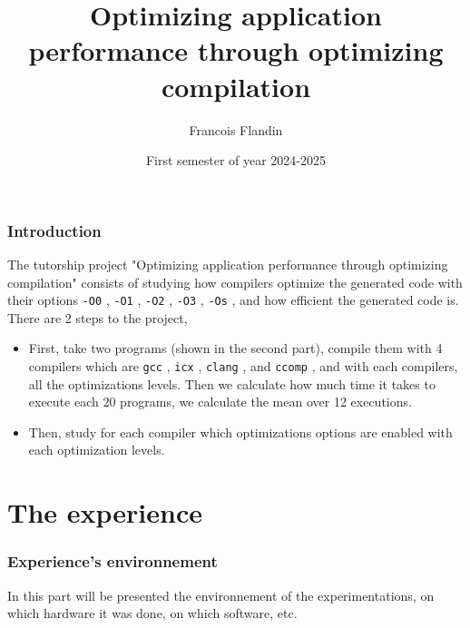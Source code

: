 \documentclass{rapport}
\title{Optimizing application performance through optimizing compilation}
\author{Francois Flandin}
\date{First semester of year 2024-2025}
\newcommand{\gcc}{\texttt{gcc} }
\newcommand{\icx}{\texttt{icx} }
\newcommand{\clang}{\texttt{clang} }
\newcommand{\comp}{\texttt{ccomp} }
\newcommand{\optizero}{\texttt{-O0} }
\newcommand{\optione}{\texttt{-O1} }
\newcommand{\optitwo}{\texttt{-O2} }
\newcommand{\optithree}{\texttt{-O3} }
\newcommand{\optisize}{\texttt{-Os} }
\begin{document}
\maketitle

\begin{abstract}

\end{abstract}

\clearpage
\tableofcontents

\clearpage
\section{Introduction}
The tutorship project "Optimizing application performance through optimizing compilation" consists of studying how compilers optimize the generated code with their options \optizero, \optione, \optitwo, \optithree, \optisize, and how efficient the generated code is.
\newline
There are 2 steps to the project,
\begin{itemize}
\item First, take two programs (shown in the second part), compile them with 4 compilers which are \gcc, \icx, \clang, and \comp, and with each compilers, all the optimizations levels.
Then we calculate how much time it takes to execute each 20 programs, we calculate the mean over 12 executions.
\item Then, study for each compiler which optimizations options are enabled with each optimization levels.
\end{itemize}
\clearpage

\part{The experience}

\section*{Experience's environnement}
In this part will be presented the environnement of the experimentations, on which hardware it was done, on which software, etc.
\end{document}
